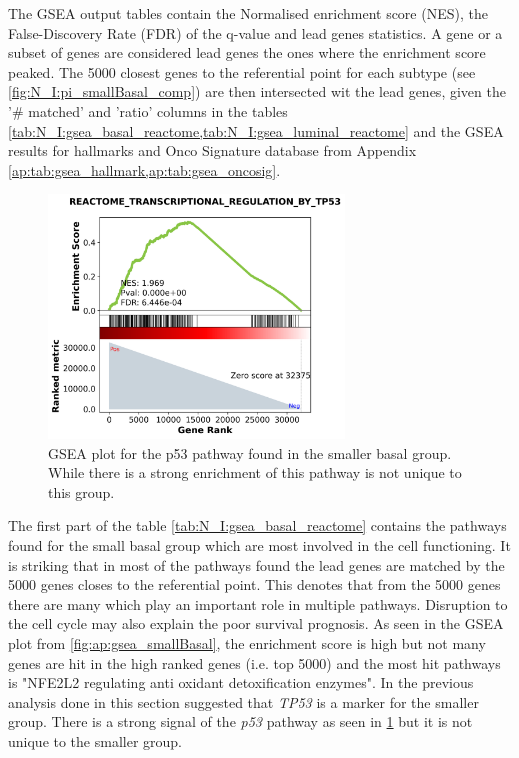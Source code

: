 The GSEA output tables contain the Normalised enrichment score (NES), the False-Discovery Rate (FDR) of the q-value and lead genes statistics. A gene or a subset of genes are considered lead genes the ones where the enrichment score peaked. The 5000 closest genes to the referential point for each subtype (see \cref{fig:N_I:pi_smallBasal_comp}) are then intersected wit the lead genes, given the '\# matched' and 'ratio' columns in the tables \cref{tab:N_I:gsea_basal_reactome,tab:N_I:gsea_luminal_reactome} and the GSEA results for hallmarks and Onco Signature database from Appendix \cref{ap:tab:gsea_hallmark,ap:tab:gsea_oncosig}.

\begin{figure}[!htb]   
\centering
\includegraphics[width=0.7\textwidth,height=0.7\textheight,keepaspectratio]{Sections/Network_I/Resources/selective_pruning/gsea/REACTOME_TRANSCRIPTIONAL_REGULATION_BY_TP53.png}
  \caption{GSEA plot for the p53 pathway found in the smaller basal group. While there is a strong enrichment of this pathway is not unique to this group.}
\label{fig:N_I:gsea_p53_smallBasal}
\end{figure}

The first part of the table \cref{tab:N_I:gsea_basal_reactome} contains the pathways found for the small basal group which are most involved in the cell functioning. It is striking that in most of the pathways found the lead genes are matched by the 5000 genes closes to the referential point. This denotes that from the 5000 genes there are many which play an important role in multiple pathways. Disruption to the cell cycle may also explain the poor survival prognosis. As seen in the GSEA plot from \cref{fig:ap:gsea_smallBasal}, the enrichment score is high but not many genes are hit in the high ranked genes (i.e. top 5000) and the most hit pathways is "NFE2L2 regulating anti oxidant detoxification enzymes". In the previous analysis done in this section suggested that \textit{TP53} is a marker for the smaller group. There is a 
strong signal of the \textit{p53} pathway as seen in \cref{fig:N_I:gsea_p53_smallBasal} but it is not unique to the smaller group.

